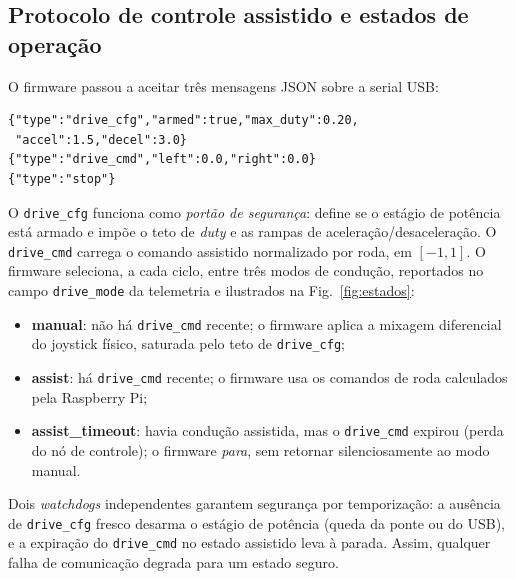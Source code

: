 \documentclass[conference]{IEEEtran}
\begin{document}
\subsection{Protocolo de controle assistido e estados de operação}

O firmware passou a aceitar três mensagens JSON sobre a serial USB:

\begin{lstlisting}[basicstyle=\ttfamily\scriptsize]
{"type":"drive_cfg","armed":true,"max_duty":0.20,
 "accel":1.5,"decel":3.0}
{"type":"drive_cmd","left":0.0,"right":0.0}
{"type":"stop"}
\end{lstlisting}

O \texttt{drive\_cfg} funciona como \emph{portão de segurança}: define se o
estágio de potência está armado e impõe o teto de \emph{duty} e as rampas de
aceleração/desaceleração. O \texttt{drive\_cmd} carrega o comando assistido
normalizado por roda, em $[-1,1]$. O firmware seleciona, a cada ciclo, entre
três modos de condução, reportados no campo \texttt{drive\_mode} da telemetria
e ilustrados na Fig.~\ref{fig:estados}:

\begin{itemize}
\item \textbf{manual}: não há \texttt{drive\_cmd} recente; o firmware aplica a
mixagem diferencial do joystick físico, saturada pelo teto de \texttt{drive\_cfg};
\item \textbf{assist}: há \texttt{drive\_cmd} recente; o firmware usa os comandos
de roda calculados pela Raspberry Pi;
\item \textbf{assist\_timeout}: havia condução assistida, mas o
\texttt{drive\_cmd} expirou (perda do nó de controle); o firmware \emph{para},
sem retornar silenciosamente ao modo manual.
\end{itemize}

Dois \emph{watchdogs} independentes garantem segurança por temporização: a
ausência de \texttt{drive\_cfg} fresco desarma o estágio de potência (queda da
ponte ou do USB), e a expiração do \texttt{drive\_cmd} no estado assistido leva
à parada. Assim, qualquer falha de comunicação degrada para um estado seguro.
\end{document}
